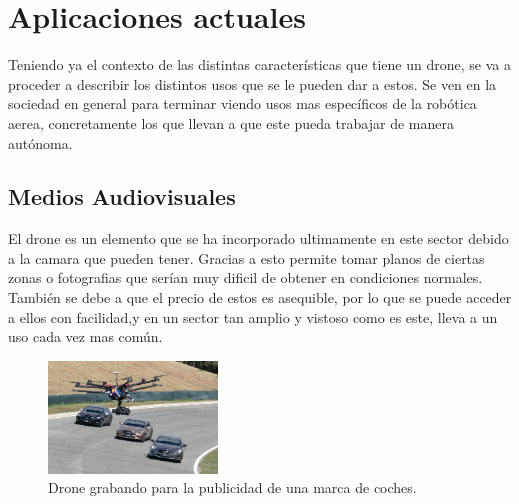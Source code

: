 \section{Aplicaciones actuales }
\hspace{1 cm} Teniendo ya el contexto de las distintas caracter\'isticas que tiene un drone, se va a proceder a describir los distintos usos que se le pueden dar a estos. Se ven en la sociedad en general para terminar viendo usos mas espec\'ificos de la rob\'otica aerea, concretamente los que llevan a que este pueda trabajar de manera aut\'onoma. 

\subsection{Medios Audiovisuales}
\hspace{1 cm} El drone es un elemento que se ha incorporado ultimamente en este sector debido a la camara que pueden tener. Gracias a esto permite tomar planos de ciertas zonas o fotografias que ser\'ian muy dificil de obtener en condiciones normales. Tambi\'en se debe a que el precio de estos es asequible, por lo que se puede acceder a ellos con facilidad,y en un sector tan amplio y vistoso como es este, lleva a un uso cada vez mas com\'un.
\begin{figure}[H]
	\centering
		\includegraphics[width=0.4\textwidth]{imgs/anuncio_television.jpg}
				\caption{Drone grabando para la publicidad de una marca de coches.}
	\label{fig:Drone grabando publicidad.}
\end{figure}



